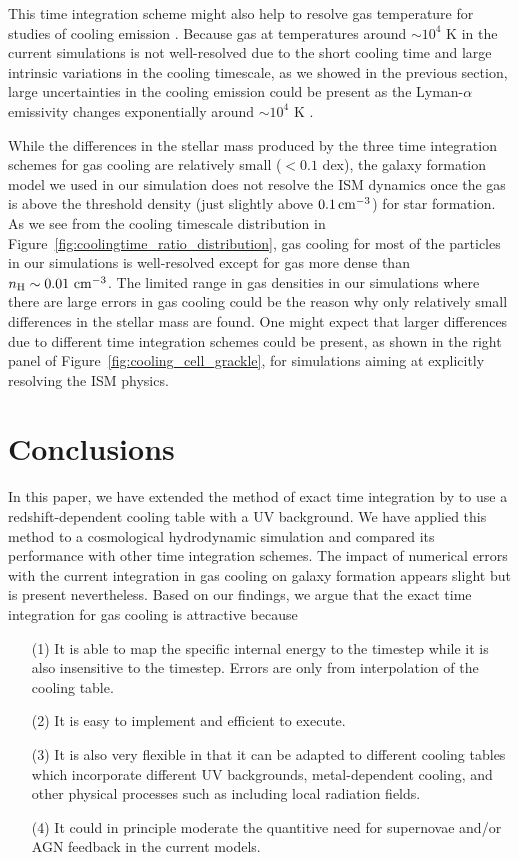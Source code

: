 \documentclass[a4paper,fleqn,usenatbib,useAMS, twocolumn]{mnras}
\begin{document}
This time integration scheme might also help to resolve gas temperature for studies of cooling 
emission \citep[][]{Haiman2000, Fardal2001ApJ, Faucher2010a}. Because gas 
at temperatures around $\sim$$10^4$ K in the
current simulations is not well-resolved due to the short cooling time and large intrinsic 
variations in the cooling timescale, as we showed in the previous section, large uncertainties in the
cooling emission could be present as the Lyman-$\alpha$ emissivity changes exponentially around  
$\sim$$10^4$ K \citep{Faucher2010}. 

While the differences in the stellar mass produced by the three time integration schemes for gas
cooling are relatively small ($<0.1$ dex), the galaxy formation model we used in our simulation does 
not resolve the ISM dynamics once the gas is above the threshold density  
(just slightly above $0.1\, \rm{cm^{-3}}$) for star formation. As we see from the cooling timescale 
distribution in Figure~\ref{fig:coolingtime_ratio_distribution}, gas cooling for most of the particles 
in our simulations is well-resolved except for gas more dense than $n_{\rm H} \sim 0.01\ {\rm cm^{-3}}$. 
The limited range in gas densities in our simulations where 
there are large errors in gas cooling could be the reason 
why only relatively 
small differences in the stellar mass are found. One might expect that larger differences due 
to different time integration schemes could be present, as shown in the right panel of
Figure~\ref{fig:cooling_cell_grackle},  for simulations aiming at explicitly resolving 
the ISM physics. 

\section{Conclusions}
\label{sec:conclusions} 

In this paper, we have extended the method of exact time integration by \cite{Townsend2009} to use 
a redshift-dependent cooling table with a UV background. We have applied this method to a
cosmological hydrodynamic simulation and compared its performance with other time integration
schemes. The impact of numerical errors with the current integration in gas cooling on galaxy 
formation appears slight but is present nevertheless. Based on our findings, we
argue that the exact time integration for gas cooling is attractive because

\begin{enumerate}
\item[(1)] It is able to map the specific internal energy to the timestep while it is also
insensitive to the timestep. 
Errors are only from interpolation of the cooling table.
\item[(2)] It is easy to implement and efficient to execute. 
\item[(3)] It is also very flexible in that it can be adapted to
different cooling tables which incorporate different UV
backgrounds, metal-dependent cooling, and other physical processes such as including local
radiation fields.  
\item[(4)] It could in principle moderate the quantitive need for supernovae and/or AGN feedback
in the current models.
\end{enumerate}
\end{document}
